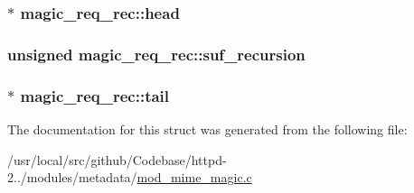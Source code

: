 \subsubsection[{\texorpdfstring{head}{head}}]{$\ast$ magic\+\_\+req\+\_\+rec\+::head}\hypertarget{structmagic__req__rec_a7003ab97a5260aa7d027dd929739a715}{}\label{structmagic__req__rec_a7003ab97a5260aa7d027dd929739a715}
\subsubsection[{\texorpdfstring{suf\+\_\+recursion}{suf_recursion}}]{\setlength{\rightskip}{0pt plus 5cm}unsigned magic\+\_\+req\+\_\+rec\+::suf\+\_\+recursion}\hypertarget{structmagic__req__rec_adb96e65e4fd3449b2f0f610b3534b90a}{}\label{structmagic__req__rec_adb96e65e4fd3449b2f0f610b3534b90a}
\subsubsection[{\texorpdfstring{tail}{tail}}]{$\ast$ magic\+\_\+req\+\_\+rec\+::tail}\hypertarget{structmagic__req__rec_a6a06479eda3d368fc68464abd82bae3b}{}\label{structmagic__req__rec_a6a06479eda3d368fc68464abd82bae3b}


The documentation for this struct was generated from the following file\+:\begin{DoxyCompactItemize}
\item 
/usr/local/src/github/\+Codebase/httpd-\/2../modules/metadata/\hyperlink{mod__mime__magic_8c}{mod\+\_\+mime\+\_\+magic.\+c}\end{DoxyCompactItemize}
